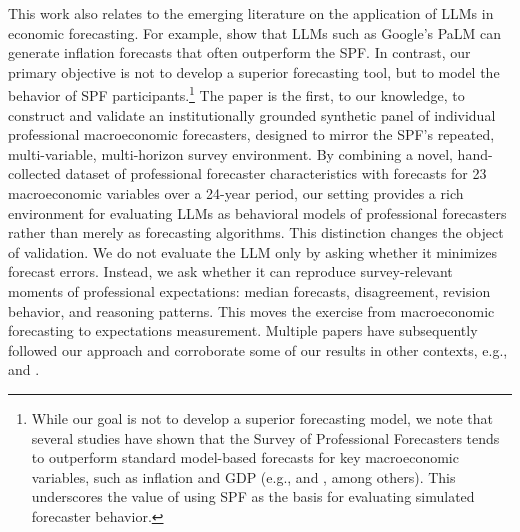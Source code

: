 \documentclass[11pt,letterpaper]{scrartcl}
\begin{document}
This work also relates to the emerging literature on the application of LLMs in economic forecasting. For example, \citet{faria2023artificial} show that LLMs such as Google's PaLM can generate inflation forecasts that often outperform the SPF. In contrast, our primary objective is not to develop a superior forecasting tool, but to model the behavior of SPF participants.\footnote{While our goal is not to develop a superior forecasting model, we note that several studies have shown that the Survey of Professional Forecasters tends to outperform standard model-based forecasts for key macroeconomic variables, such as inflation and GDP (e.g., \citealp{ang2007} and \citealp{stark2010}, among others). This underscores the value of using SPF as the basis for evaluating simulated forecaster behavior.} The paper is the first, to our knowledge, to construct and validate an institutionally grounded synthetic panel of individual professional macroeconomic forecasters, designed to mirror the SPF’s repeated, multi-variable, multi-horizon survey environment.
By combining a novel, hand-collected dataset of professional forecaster characteristics with forecasts for 23 macroeconomic variables over a 24-year period, our setting provides a rich environment for evaluating LLMs as behavioral models of professional forecasters rather than merely as forecasting algorithms.
This distinction changes the object of validation. We do not evaluate the LLM only by asking whether it minimizes forecast errors. Instead, we ask whether it can reproduce survey-relevant moments of professional expectations: median forecasts, disagreement, revision behavior, and reasoning patterns. This moves the exercise from macroeconomic forecasting to expectations measurement. Multiple papers have subsequently followed our approach and corroborate some of our results in other contexts, e.g., \citet{wu2025llmsurvey} and \citet{graham2926cfos}.
\end{document}

